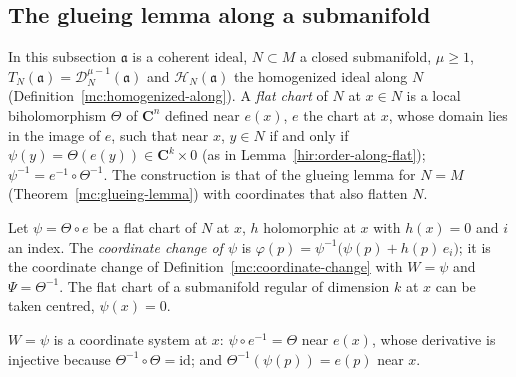 \subsection{The glueing lemma along a submanifold}

In this subsection \(\mathfrak a\) is a coherent ideal, \(N\subset M\) a closed submanifold, \(\mu\ge1\), \(T_N(\mathfrak a)=\mathcal D_N^{\mu-1}(\mathfrak a)\) and
\(\mathcal H_N(\mathfrak a)\) the homogenized ideal along \(N\) (Definition~\ref{mc:homogenized-along}). A \emph{flat chart} of \(N\) at \(x\in N\) is a local
biholomorphism \(\Theta\) of \(\mathbf C^n\) defined near \(e(x)\), \(e\) the chart at \(x\), whose domain lies in the image of \(e\), such that near \(x\), \(y\in N\) if and only if
\(\psi(y)=\Theta(e(y))\in\mathbf C^k\times0\) (as in Lemma~\ref{hir:order-along-flat}); \(\psi^{-1}=e^{-1}\circ\Theta^{-1}\). The construction is that of the
glueing lemma for \(N=M\) (Theorem~\ref{mc:glueing-lemma}) with coordinates that also flatten \(N\).

\begin{definition}
\label{mc:flat-change}
\leanok
Let \(\psi=\Theta\circ e\) be a flat chart of \(N\) at \(x\), \(h\) holomorphic at \(x\) with \(h(x)=0\) and \(i\) an index. The \emph{coordinate change of \(\psi\)} is
\(\varphi(p)=\psi^{-1}\bigl(\psi(p)+h(p)\,e_i\bigr)\); it is the coordinate change of Definition~\ref{mc:coordinate-change} with \(W=\psi\) and \(\Psi=\Theta^{-1}\).
The flat chart of a submanifold regular of dimension \(k\) at \(x\) can be taken centred, \(\psi(x)=0\).
\end{definition}
\(W=\psi\) is a coordinate system at \(x\): \(\psi\circ e^{-1}=\Theta\) near \(e(x)\), whose derivative is injective because \(\Theta^{-1}\circ\Theta=\mathrm{id}\); and
\(\Theta^{-1}(\psi(p))=e(p)\) near \(x\).

